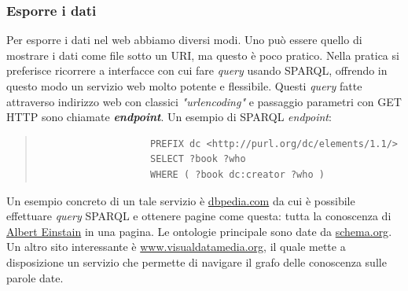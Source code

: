 			\subsubsection{Esporre i dati}
				Per esporre i dati nel web abbiamo diversi modi. Uno può essere quello di mostrare i dati come file sotto un URI, ma questo è poco pratico. Nella pratica si preferisce ricorrere a interfacce con cui fare \emph{query} usando SPARQL, offrendo in questo modo un servizio web molto potente e flessibile. Questi \emph{query} fatte attraverso indirizzo web con classici \emph{"urlencoding"} e passaggio parametri con GET HTTP sono chiamate \textbf{\emph{endpoint}}. Un esempio di SPARQL \emph{endpoint}:
				\begin{quote}
				\begin{verbatim}
					PREFIX dc <http://purl.org/dc/elements/1.1/>
					SELECT ?book ?who
					WHERE ( ?book dc:creator ?who )
				\end{verbatim}
				\end{quote}
				Un esempio concreto di un tale servizio è \href{http://wiki.dbpedia.org/}{dbpedia.com} da cui è possibile effettuare \emph{query} SPARQL e ottenere pagine come questa: tutta la conoscenza di \href{http://dbpedia.org/page/Albert_Einstein}{Albert Einstain} in una pagina.
				Le ontologie principale sono date da \href{https://schema.org/}{schema.org}. Un altro sito interessante è \href{http://www.visualdataweb.org/relfinder.php}{www.visualdatamedia.org}, il quale mette a disposizione un servizio che permette di navigare il grafo delle conoscenza sulle parole date. 
					
					
					